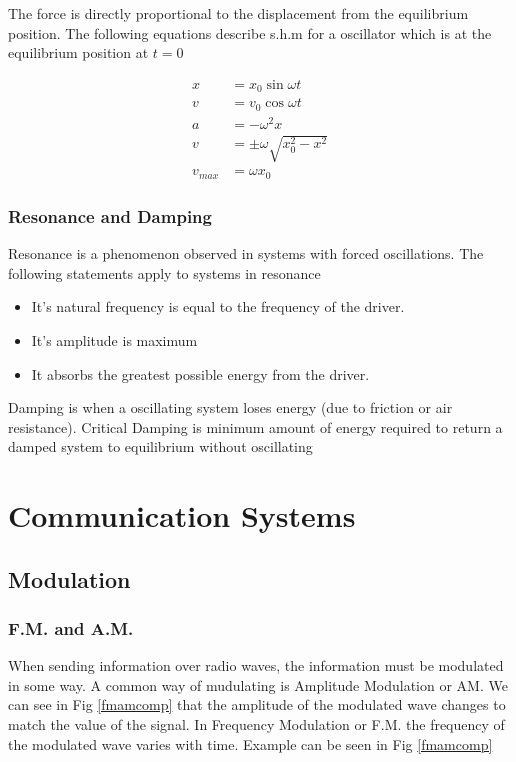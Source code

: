 \documentclass{scrbook}
\begin{document}
	The force is directly proportional to the displacement from the equilibrium position. The following equations describe s.h.m for a oscillator which is at the equilibrium position at $t = 0$

	\begin{align*}
		x &= x_0\sin{\omega t}
		\\
		v &= v_0\cos{\omega t}
		\\
		a &= -\omega^2x
		\\
		v &= \pm \omega \sqrt{x_0^2 - x^2}
		\\
		v_{max} &= \omega x_0
	\end{align*}

\subsection{Resonance and Damping}

	Resonance is a phenomenon observed in systems with forced oscillations. The following statements apply to systems in resonance

	\begin{itemize}
		\item
			It's natural frequency is equal to the frequency of the driver.
		\item
			It's amplitude is maximum
		\item
			It absorbs the greatest possible energy from the driver.
	\end{itemize}

	Damping is when a oscillating system loses energy (due to friction or air resistance). Critical Damping is minimum amount of energy required to return a damped system to equilibrium without oscillating

\chapter{Communication Systems}

\section{Modulation}

\subsection{F.M. and A.M.}

	When sending information over radio waves, the information must be modulated in some way. A common way of mudulating is Amplitude Modulation or AM. We can see in Fig \ref{fmamcomp} that the amplitude of the modulated wave changes to match the value of the signal. In Frequency Modulation or F.M. the frequency of the modulated wave varies with time. Example can be seen in Fig \ref{fmamcomp}
\end{document}
